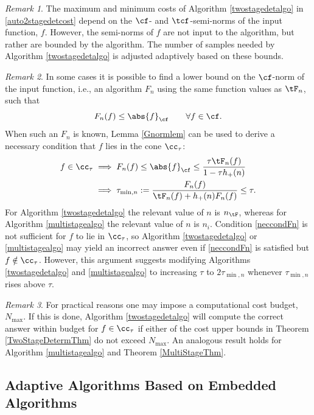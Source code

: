 \documentclass[]{elsarticle}
\theoremstyle{definition}
\theoremstyle{remark}
\newtheorem{rem}{Remark}
\newcommand{\Fnorm}[1]{\abs{#1}_{\cf}}
\begin{document}
\begin{rem} The maximum and minimum costs of Algorithm \ref{twostagedetalgo} in \eqref{auto2stagedetcost} depend on the $\cf$- and $\tcf$-semi-norms of the input function, $f$.  However, the semi-norms of $f$ are not input to the algorithm, but rather are bounded by the algorithm.  The number of samples needed by Algorithm \ref{twostagedetalgo} is adjusted adaptively based on these bounds.
\end{rem}

\begin{rem} \label{neccondrem} In some cases it is possible to find a lower bound on the $\cf$-norm of the input function, i.e., an algorithm $F_n$ using the same function values as $\tF_n$, such that
\[
F_n(f) \le \Fnorm{f} \qquad \forall f \in \cf.
\]
When such an $F_n$ is known, Lemma \ref{Gnormlem} can be used to derive a necessary condition that $f$ lies in the cone $\cc_\tau$:
\begin{align}
\nonumber
f \in \cc_\tau 
& \implies F_n(f) \le \Fnorm{f} \le \frac{\tau \tF_n(f)}{1-\tau h_+(n)}\\
& \implies \tau_{\min,n}:= \frac{F_n(f)}{\tF_n(f) + h_+(n) F_n(f)} \le \tau.
\label{neccondFn}
\end{align}
For Algorithm \ref{twostagedetalgo} the relevant value of $n$ is $n_{\tF}$, whereas for Algorithm \ref{multistagealgo} the relevant value of $n$ is $n_i$.
Condition \eqref{neccondFn} is not sufficient for $f$ to lie in $\cc_{\tau}$, so Algorithm \ref{twostagedetalgo} or \ref{multistagealgo} may yield an incorrect answer even if \eqref{neccondFn} is satisfied but $f \notin \cc_{\tau}$.  However, this argument suggests modifying Algorithms \ref{twostagedetalgo} and \ref{multistagealgo} to increasing $\tau$ to $2 \tau_{\min,n}$ whenever  $\tau_{\min,n}$ rises above $\tau$. 
\end{rem}

\begin{rem} \label{Nmaxrem}  For practical reasons one may impose a computational cost budget, $N_{\max}$.  If this is done, Algorithm \ref{twostagedetalgo} will compute the correct answer within budget for $f \in \cc_{\tau}$ if either of the cost upper bounds in Theorem \ref{TwoStageDetermThm} do not exceed $N_{\max}$.  An analogous result holds for Algorithm \ref{multistagealgo} and Theorem \ref{MultiStageThm}.
\end{rem}

\subsection{Adaptive Algorithms Based on Embedded Algorithms}
\end{document}
